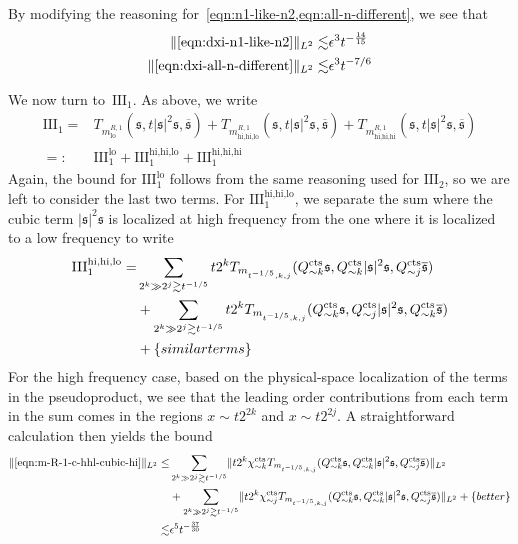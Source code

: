 \documentclass[letterpaper, reqno,final]{amsart}
\newcommand{\fs}{\mathfrak{s}}
\newcommand{\rmIII}{\mathrm{III}}
\newcommand{\tcts}{\text{cts}}
\newcommand{\fProjc}[1]{{Q^{\tcts}_{#1}}}
\newcommand{\btext}[1]{\left\{\textup{#1}\right\}}
\newcommand{\bbetter}{\btext{better}}
\newcommand{\bsim}{\btext{similar terms}}
\begin{document}
By modifying the reasoning for~\cref{eqn:n1-like-n2,eqn:all-n-different}, we see that
\begin{equation*}\begin{split}
    \lVert \eqref{eqn:dxi-n1-like-n2} \rVert_{L^2} \lesssim& \epsilon^3 t^{-\frac{14}{15}}\\
    \lVert \eqref{eqn:dxi-all-n-different} \rVert_{L^2} \lesssim& \epsilon^3 t^{-7/6}
\end{split}\end{equation*}

We now turn to~$\rmIII_1$.  As above, we write
\begin{equation*}\begin{split}
    \rmIII_1 =& T_{m^{R,1}_{\text{lo}}}(\fs, t|\fs|^2\fs, \overline{\fs}) + T_{m^{R,1}_{\text{hi,hi,lo}}}(\fs, t|\fs|^2\fs, \overline{\fs}) + T_{m^{R,1}_{\text{hi,hi,hi}}}(\fs, t|\fs|^2\fs, \overline{\fs})\\
    =:& \rmIII_1^\text{lo} + \rmIII_1^\text{hi,hi,lo} + \rmIII_1^\text{hi,hi,hi}
\end{split}\end{equation*}
Again, the bound for $\rmIII_1^\text{lo}$ follows from the same reasoning used for $\rmIII_2$, so we are left to consider the last two terms.  For $\rmIII_1^\text{hi,hi,lo}$, we separate the sum where the cubic term $|\fs|^2\fs$ is localized at high frequency from the one where it is localized to a low frequency to write
\begin{subequations}\begin{align}
    \rmIII_1^\text{hi,hi,lo} =& \sum_{2^k \gg 2^j \gtrsim t^{-1/5}} t2^k T_{m_{t^{-1/5},k,j}}(\fProjc{\sim k}\fs, \fProjc{\sim k}|\fs|^2\fs, \fProjc{\sim j}\overline{\fs})\label{eqn:m-R-1-c-hhl-cubic-hi}\\
    &+ \sum_{2^k \gg 2^j \gtrsim t^{-1/5}} t2^k T_{m_{t^{-1/5},k,j}}(\fProjc{\sim k}\fs, \fProjc{\sim j}|\fs|^2\fs, \fProjc{\sim k}\overline{\fs})\label{eqn:m-R-1-c-hhl-cubic-lo}\\
    &+ \bsim\notag
\end{align}
\end{subequations}
For the high frequency case, based on the physical-space localization of the terms in the pseudoproduct, we see that the leading order contributions from each term in the sum comes in the regions $x \sim t2^{2k}$ and $x \sim t 2^{2j}$.  A straightforward calculation then yields the bound
\begin{equation*}\begin{split}
    \lVert \eqref{eqn:m-R-1-c-hhl-cubic-hi} \rVert_{L^2} \leq& \sum_{2^k \gg 2^j \gtrsim t^{-1/5}} \lVert t2^k \chi_{\sim k}^\tcts T_{m_{t^{-1/5},k,j}}(\fProjc{\sim k}\fs, \fProjc{\sim k}|\fs|^2\fs, \fProjc{\sim j}\overline{\fs}) \rVert_{L^2}\\
    &+ \sum_{2^k \gg 2^j \gtrsim t^{-1/5}} \lVert t2^k \chi_{\sim j}^\tcts T_{m_{t^{-1/5},k,j}}(\fProjc{\sim k}\fs, \fProjc{\sim k}|\fs|^2\fs, \fProjc{\sim j}\overline{\fs}) \rVert_{L^2}+ \bbetter\\
    \lesssim& \epsilon^5 t^{-\frac{37}{30}}
\end{split}\end{equation*}
\end{document}
